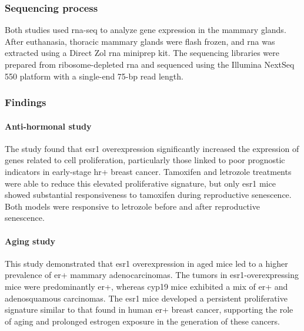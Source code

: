 \subsubsection{Sequencing process} \label{sec:dataset_sequencing}
Both studies used \gls{rna-seq} to analyze gene expression in the mammary
glands.
After euthanasia, thoracic mammary glands were flash frozen, and \gls{rna} was
extracted using a Direct Zol \gls{rna} miniprep kit.
The sequencing libraries were prepared from ribosome-depleted \gls{rna} and
sequenced using the Illumina NextSeq 550 platform with a single-end 75-bp read
length\supercite{furth_esr1_2023,furth_overexpression_2023}.

\subsubsection{Findings}

\paragraph{Anti-hormonal study}
The study found that \gls{esr1} overexpression significantly increased the
expression of genes related to cell proliferation, particularly those linked to
poor prognostic indicators in early-stage \gls{hr+} breast cancer.
Tamoxifen and letrozole treatments were able to reduce this elevated
proliferative signature, but only \gls{esr1} mice showed substantial
responsiveness to tamoxifen during reproductive senescence.
Both models were responsive to letrozole before and after reproductive
senescence\supercite{furth_esr1_2023}.

\paragraph{Aging study}
This study demonstrated that \gls{esr1} overexpression in aged mice led to a
higher prevalence of \gls{er+} mammary adenocarcinomas.
The tumors in \gls{esr1}-overexpressing mice were predominantly
\gls{er+}, whereas \gls{cyp19} mice exhibited a mix of
\gls{er+} and adenosquamous carcinomas.
The \gls{esr1} mice developed a persistent proliferative signature similar to
that found in human \gls{er+} breast cancer, supporting the role of
aging and prolonged estrogen exposure in the generation of these
cancers\supercite{furth_overexpression_2023}.
